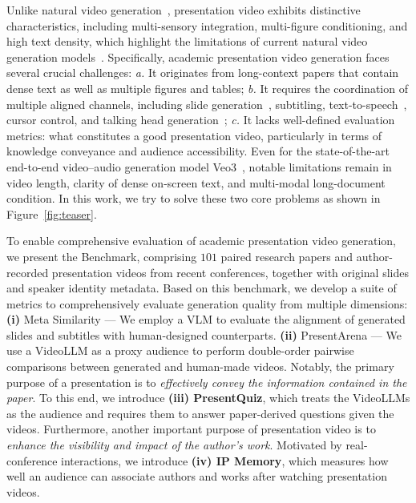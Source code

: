 \vspace{-0.2\baselineskip} 
Unlike natural video generation~\cite{sd_video,show_1,wan,deepmind2025veo3}, presentation video exhibits distinctive characteristics, including multi-sensory integration, multi-figure conditioning, and high text density, which highlight the limitations of current natural video generation models~\cite{ma2025controllable}. Specifically, academic presentation video generation faces several crucial challenges:
\textit{a.} It originates from long-context papers that contain dense text as well as multiple figures and tables;
\textit{b.} It requires the coordination of multiple aligned channels, including slide generation~\cite{zheng2025pptagent}, subtitling, text-to-speech~\cite{tts-f5}, cursor control, and talking head generation~\cite{fantasytalking,cui2024hallo2};
\textit{c.} It lacks well-defined evaluation metrics: what constitutes a good presentation video, particularly in terms of knowledge conveyance and audience accessibility. Even for the state-of-the-art end-to-end video–audio generation model Veo3~\cite{deepmind2025veo3}, notable limitations remain in video length, clarity of dense on-screen text, and multi-modal long-document condition.
In this work, we try to solve these two core problems as shown in Figure~\ref{fig:teaser}.

\vspace{-0.2\baselineskip} 
To enable comprehensive evaluation of academic presentation video generation, we present the \textbf{\bench} Benchmark, comprising $101$ paired research papers and author-recorded presentation videos from recent conferences, together with original slides and speaker identity metadata. Based on this benchmark, we develop a suite of metrics to comprehensively evaluate generation quality from multiple dimensions: 
\textbf{(i)} Meta Similarity — We employ a VLM to evaluate the alignment of generated slides and subtitles with human-designed counterparts.
\textbf{(ii)} PresentArena — We use a VideoLLM as a proxy audience to perform double-order pairwise comparisons between generated and human-made videos.
Notably, the primary purpose of a presentation is to \textit{effectively convey the information contained in the paper}. To this end, we introduce \textbf{(iii) PresentQuiz}, which treats the VideoLLMs as the audience and requires them to answer paper-derived questions given the videos. Furthermore, another important purpose of presentation video is to \textit{enhance the visibility and impact of the author’s work}. Motivated by real-conference interactions, we introduce \textbf{(iv) IP Memory}, which measures how well an audience can associate authors and works after watching presentation videos.

